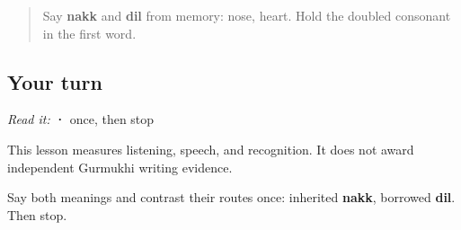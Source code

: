 \label{lesson:PA-R27-nose-heart-r4}



\begin{quote}
Say \textbf{nakk} and \textbf{dil} from memory: nose, heart. Hold the doubled consonant in the first word.
\end{quote}

\subsection*{Your turn}
\emph{Read it:} \textbf{ · } once, then stop

This lesson measures listening, speech, and recognition. It does not award independent Gurmukhi writing evidence.

\begin{tcolorbox}[breakable,colback=teal!4,colframe=teal!35!black,title={Before you move on}]
Say both meanings and contrast their routes once: inherited \textbf{nakk}, borrowed \textbf{dil}. Then stop.
\end{tcolorbox}
